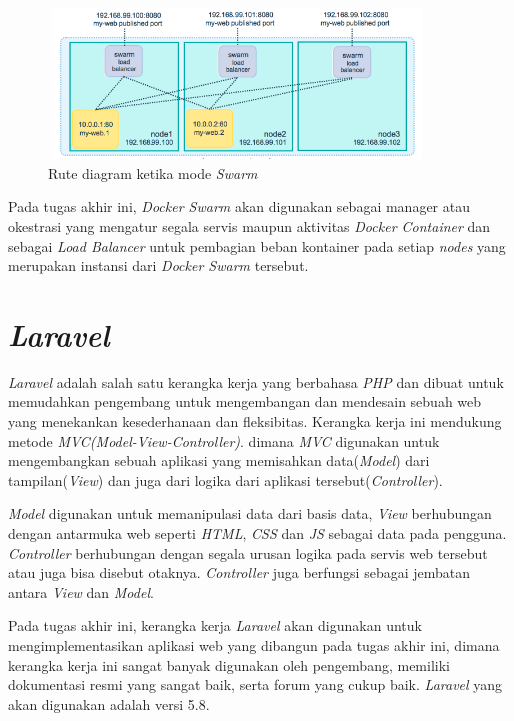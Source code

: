 			\begin{figure}[H]
				\centering
				\includegraphics[width=10cm,height=4cm]{Images/C-2/swarmdiagramroute.png}
				\caption{Rute diagram ketika mode \textit{Swarm}\cite{docker_swarm_route}}
				\label{swarmdiagramroute}
			\end{figure}
		
			\indent Pada tugas akhir ini, \textit{Docker Swarm} akan digunakan sebagai manager atau okestrasi yang mengatur segala servis maupun aktivitas \textit{Docker Container} dan sebagai \textit{Load Balancer} untuk pembagian beban kontainer pada setiap \textit{nodes} yang merupakan instansi dari \textit{Docker Swarm} tersebut.
			
			
		
	\section{\textit{Laravel}}
		\textit{Laravel} adalah salah satu kerangka kerja yang berbahasa \textit{PHP} dan dibuat untuk memudahkan pengembang untuk mengembangan dan mendesain sebuah web yang menekankan kesederhanaan dan fleksibitas. Kerangka kerja ini mendukung metode \textit{MVC(Model-View-Controller)}. dimana \textit{MVC} digunakan untuk mengembangkan sebuah aplikasi yang memisahkan data(\textit{Model}) dari tampilan(\textit{View}) dan juga dari logika dari aplikasi tersebut(\textit{Controller})\cite{laraveframework}.
		
		\indent \textit{Model} digunakan untuk memanipulasi data dari basis data, \textit{View} berhubungan dengan antarmuka web seperti \textit{HTML}, \textit{CSS} dan \textit{JS} sebagai data pada pengguna. \textit{Controller} berhubungan dengan segala urusan logika pada servis web tersebut atau juga bisa disebut otaknya. \textit{Controller} juga berfungsi sebagai jembatan antara \textit{View} dan \textit{Model}\cite{laraveframework}.
	
		\indent Pada tugas akhir ini, kerangka kerja \textit{Laravel} akan digunakan untuk mengimplementasikan aplikasi web yang dibangun pada tugas akhir ini, dimana kerangka kerja ini sangat banyak digunakan oleh pengembang, memiliki dokumentasi resmi yang sangat baik, serta forum yang cukup baik. \textit{Laravel} yang akan digunakan adalah versi 5.8.